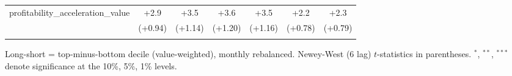 \begin{table}[htbp]
\begin{threeparttable}
\begin{tabular}{lcccccc}
\addlinespace
profitability\_acceleration\_value & +2.9 & +3.5 & +3.6 & +3.5 & +2.2 & +2.3 \\
 & (+0.94) & (+1.14) & (+1.20) & (+1.16) & (+0.78) & (+0.79) \\
\addlinespace
\bottomrule
\end{tabular}
\begin{tablenotes}\footnotesize
\item Long-short = top-minus-bottom decile (value-weighted), monthly rebalanced. Newey-West (6 lag) $t$-statistics in parentheses. $^{*}$, $^{**}$, $^{***}$ denote significance at the 10\%, 5\%, 1\% levels.
\end{tablenotes}
\end{threeparttable}
\end{table}